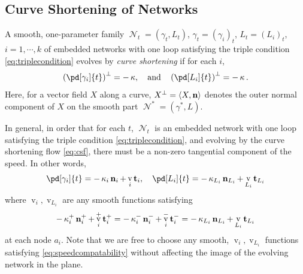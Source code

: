 \documentclass[11pt]{amsart}
\DeclareMathOperator{\tangspeed}{v}
\DeclareMathOperator{\network}{\mathcal{N}}
\begin{document}
\subsection{Curve Shortening of Networks}
\label{sec:orgheadline3}

\begin{defn}
A smooth, one-parameter family \(\network_t = (\gamma_t, L_t)\), \(\gamma_t = (\gamma_i)_t\), \(L_t = (L_i)_t\), \(i=1,\cdots,k\) of embedded networks with one loop satisfying the triple condition \eqref{eq:triplecondition} evolves by \emph{curve shortening} if for each \(i\),
\begin{equation}
\label{eq:csf}
\left(\pd[\gamma_i]{t}\right)^{\perp} = -\curvecurv, \quad \text{and} \quad \left(\pd[L_i]{t}\right)^{\perp} = -\curvecurv.
\end{equation}
Here, for a vector field \(X\) along a curve, \(X^{\perp} = \langle{X},{\operatorname{\mathbf{n}}}\rangle\) denotes the outer normal component of \(X\) on the smooth part \(\network^{\ast} = (\gamma^{\ast}, L)\).
\end{defn}

In general, in order that for each \(t\), \(\network_t\) is an embedded network with one loop satisfying the triple condition \eqref{eq:triplecondition}, and evolving by the curve shortening flow \eqref{eq:csf}, there must be a non-zero tangential component of the speed. In other words,
\begin{equation}
\label{eq:csf_with_tang}
\pd[\gamma_i]{t} = -\curvecurv_i \nor_i + \tangspeed_i \tang_i, \quad \pd[L_i]{t} = -\curvecurv_{L_i} \nor_{L_i} + \tangspeed_{L_i} \tang_{L_i}
\end{equation}
where \(\tangspeed_i, \tangspeed_{L_i}\) are any smooth functions satisfying
\begin{equation}
\label{eq:speedcompatability}
-\curvecurv_i^+ \nor_i^+ + \tangspeed_i^+ \tang_i^+ = -\curvecurv_i^- \nor_i^- + \tangspeed_i^- \tang_i^- = -\curvecurv_{L_i} \nor_{L_i} + \tangspeed_{L_i} \tang_{L_i}
\end{equation}
at each node \(a_i\). Note that we are free to choose any smooth, \(\tangspeed_i, \tangspeed_{L_i}\) functions satisfying \eqref{eq:speedcompatability} without affecting the image of the evolving network in the plane.
\end{document}
